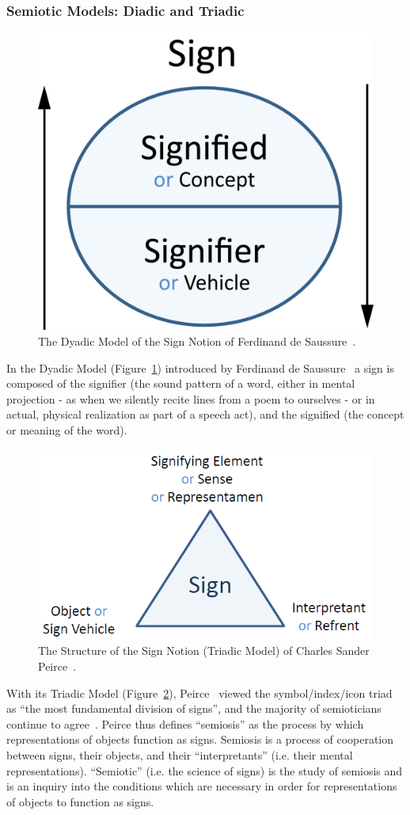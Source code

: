 
\subsubsection{Semiotic Models: Diadic and Triadic} 

\begin{figure}[!t]
 \centering
\includegraphics[width=.2\textwidth]{images/related-work-glyphs/Diadic.png}
\caption{The Dyadic Model of the Sign Notion of Ferdinand de Saussure~\cite{Saussure1983}.\label{fig:saussure}}
\end{figure}

In the Dyadic Model (Figure~\ref{fig:saussure}) introduced by Ferdinand de Saussure~\cite{Saussure1983} a sign is composed of the signifier (the sound pattern of a word, either in mental projection - as when we silently recite lines from a poem to ourselves - or in actual, physical realization as part of a speech act), and the signified (the concept or meaning of the word).

\begin{figure}[!t]
 \centering
\includegraphics[width=.4\textwidth]{images/related-work-glyphs/Triadic.png}
\caption{The Structure of the Sign Notion (Triadic Model) of Charles Sander Peirce~\cite{Peirce1955}.\label{fig:peirce}}
\end{figure}  

With its Triadic Model (Figure~\ref{fig:peirce}), Peirce~\cite{Peirce1955} viewed the symbol/index/icon triad as ``the most fundamental division of signs'', and the majority of semioticians continue to agree~\cite{Johansen1988}. 
Peirce thus defines ``semiosis'' as the process by which representations of objects function as signs. Semiosis is a process of cooperation between signs, their objects, and their ``interpretants'' (i.e. their mental representations). ``Semiotic'' (i.e. the science of signs) is the study of semiosis and is an inquiry into the conditions which are necessary in order for representations of objects to function as signs.

